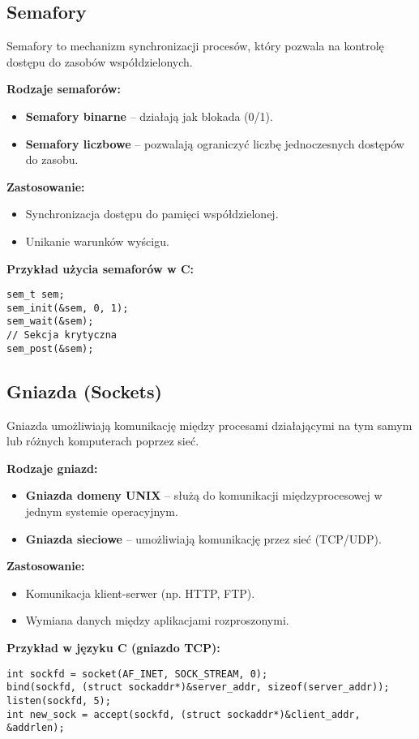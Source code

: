 \subsection{Semafory}
Semafory to mechanizm synchronizacji procesów, który pozwala na kontrolę dostępu do zasobów współdzielonych.

\textbf{Rodzaje semaforów:}
\begin{itemize}
    \item \textbf{Semafory binarne} – działają jak blokada (0/1).
    \item \textbf{Semafory liczbowe} – pozwalają ograniczyć liczbę jednoczesnych dostępów do zasobu.
\end{itemize}

\textbf{Zastosowanie:}
\begin{itemize}
    \item Synchronizacja dostępu do pamięci współdzielonej.
    \item Unikanie warunków wyścigu.
\end{itemize}

\textbf{Przykład użycia semaforów w C:}
\begin{verbatim}
sem_t sem;
sem_init(&sem, 0, 1);
sem_wait(&sem);
// Sekcja krytyczna
sem_post(&sem);
\end{verbatim}

\subsection{Gniazda (Sockets)}
Gniazda umożliwiają komunikację między procesami działającymi na tym samym lub różnych komputerach poprzez sieć.

\textbf{Rodzaje gniazd:}
\begin{itemize}
    \item \textbf{Gniazda domeny UNIX} – służą do komunikacji międzyprocesowej w jednym systemie operacyjnym.
    \item \textbf{Gniazda sieciowe} – umożliwiają komunikację przez sieć (TCP/UDP).
\end{itemize}

\textbf{Zastosowanie:}
\begin{itemize}
    \item Komunikacja klient-serwer (np. HTTP, FTP).
    \item Wymiana danych między aplikacjami rozproszonymi.
\end{itemize}

\textbf{Przykład w języku C (gniazdo TCP):}
\begin{verbatim}
int sockfd = socket(AF_INET, SOCK_STREAM, 0);
bind(sockfd, (struct sockaddr*)&server_addr, sizeof(server_addr));
listen(sockfd, 5);
int new_sock = accept(sockfd, (struct sockaddr*)&client_addr, &addrlen);
\end{verbatim}

